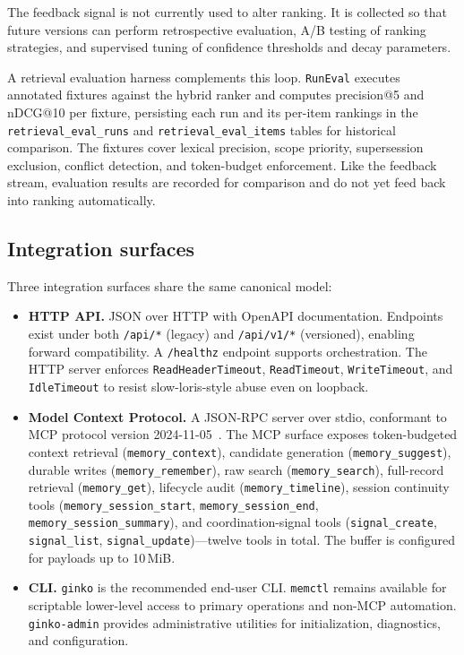 \documentclass[11pt,a4paper]{article}
\begin{document}
The feedback signal is not currently used to alter ranking. It is collected so that future versions can perform retrospective evaluation, A/B testing of ranking strategies, and supervised tuning of confidence thresholds and decay parameters.

A retrieval evaluation harness complements this loop. \texttt{RunEval} executes annotated fixtures against the hybrid ranker and computes precision@5 and nDCG@10 per fixture, persisting each run and its per-item rankings in the \texttt{retrieval\_eval\_runs} and \texttt{retrieval\_eval\_items} tables for historical comparison. The fixtures cover lexical precision, scope priority, supersession exclusion, conflict detection, and token-budget enforcement. Like the feedback stream, evaluation results are recorded for comparison and do not yet feed back into ranking automatically.

\subsection{Integration surfaces}

Three integration surfaces share the same canonical model:

\begin{itemize}
 \item \textbf{HTTP API.} JSON over HTTP with OpenAPI documentation. Endpoints exist under both \texttt{/api/*} (legacy) and \texttt{/api/v1/*} (versioned), enabling forward compatibility. A \texttt{/healthz} endpoint supports orchestration. The HTTP server enforces \texttt{ReadHeaderTimeout}, \texttt{ReadTimeout}, \texttt{WriteTimeout}, and \texttt{IdleTimeout} to resist slow-loris-style abuse even on loopback.
 \item \textbf{Model Context Protocol.} A JSON-RPC server over stdio, conformant to MCP protocol version 2024-11-05~\cite{mcpspec}. The MCP surface exposes token-budgeted context retrieval (\texttt{memory\_context}), candidate generation (\texttt{memory\_suggest}), durable writes (\texttt{memory\_remember}), raw search (\texttt{memory\_search}), full-record retrieval (\texttt{memory\_get}), lifecycle audit (\texttt{memory\_timeline}), session continuity tools (\texttt{memory\_session\_start}, \texttt{memory\_session\_end}, \texttt{memory\_session\_summary}), and coordination-signal tools (\texttt{signal\_create}, \texttt{signal\_list}, \texttt{signal\_update})---twelve tools in total. The buffer is configured for payloads up to 10\,MiB.
 \item \textbf{CLI.} \texttt{ginko} is the recommended end-user CLI. \texttt{memctl} remains available for scriptable lower-level access to primary operations and non-MCP automation. \texttt{ginko-admin} provides administrative utilities for initialization, diagnostics, and configuration.
\end{itemize}
\end{document}
